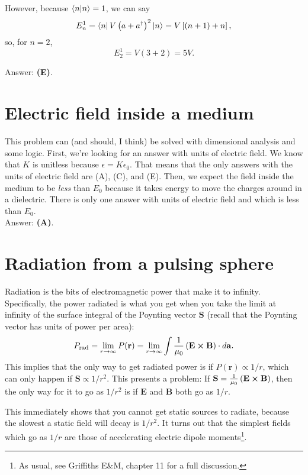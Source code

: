 \documentclass[11pt]{paper}
\newcommand{\answer}[1]{Answer: \textbf{(#1)}.}
\begin{document}
However, because $\bra{n}\ket{n}=1$, we can say
\begin{equation}
	E_n^1 = \bra{n}V\left(a+a^\dagger\right)^2\ket{n} = V\left[(n+1) + n\right],
\end{equation}
so, for $n=2$,
\begin{equation}
	E_2^1 = V(3+2) = 5V.
\end{equation}

\answer{E}

\section{Electric field inside a medium}
This problem can (and should, I think) be solved with dimensional analysis and some logic.  First, we're looking for an answer with units of electric field.  We know that $K$ is unitless because $\epsilon = K\epsilon_0$.  That means that the only answers with the units of electric field are (A), (C), and (E).  Then, we expect the field inside the medium to be \emph{less} than $E_0$ because it takes energy to move the charges around in a dielectric.  There is only one answer with units of electric field and which is less than $E_0$.\\

\answer{A}

\section{Radiation from a pulsing sphere}
Radiation is the bits of electromagnetic power that make it to infinity.  Specifically, the power radiated is what you get when you take the limit at infinity of the surface integral of the Poynting vector $\mathbf{S}$ (recall that the Poynting vector has units of power per area):
\begin{equation}
	P_\text{rad} = \lim_{r\rightarrow\infty}P(\mathbf{r}) = \lim_{r\rightarrow\infty} \int \frac{1}{\mu_0}\left(\mathbf{E}\cross\mathbf{B}\right) \cdot d\mathbf{a}.
\end{equation}
This implies that the only way to get radiated power is if $P(\mathbf{r})\propto 1/r$, which can only happen if $\mathbf{S} \propto 1/r^2$.  This presents a problem: If $\mathbf{S}=\frac{1}{\mu_0}\left(\mathbf{E}\cross\mathbf{B}\right)$, then the only way for it to go as $1/r^2$ is if $\mathbf{E}$ and $\mathbf{B}$ both go as $1/r$.

This immediately shows that you cannot get static sources to radiate, because the slowest a static field will decay is $1/r^2$.  It turns out that the simplest fields which go as $1/r$ are those of accelerating electric dipole moments\footnote{As usual, see Griffiths E\&M, chapter 11 for a full discussion.}.
\end{document}
